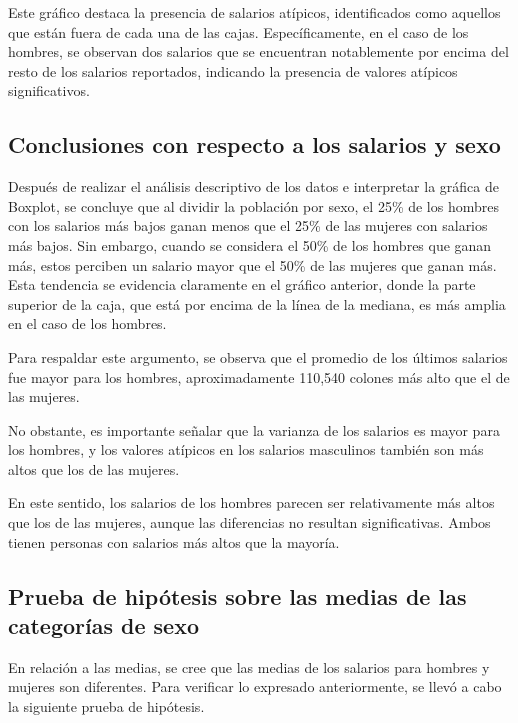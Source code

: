 \documentclass[
]{article}
\begin{document}
Este gráfico destaca la presencia de salarios atípicos, identificados
como aquellos que están fuera de cada una de las cajas. Específicamente,
en el caso de los hombres, se observan dos salarios que se encuentran
notablemente por encima del resto de los salarios reportados, indicando
la presencia de valores atípicos significativos.

\hypertarget{conclusiones-con-respecto-a-los-salarios-y-sexo}{%
\subsection{Conclusiones con respecto a los salarios y
sexo}\label{conclusiones-con-respecto-a-los-salarios-y-sexo}}

Después de realizar el análisis descriptivo de los datos e interpretar
la gráfica de Boxplot, se concluye que al dividir la población por sexo,
el 25\% de los hombres con los salarios más bajos ganan menos que el
25\% de las mujeres con salarios más bajos. Sin embargo, cuando se
considera el 50\% de los hombres que ganan más, estos perciben un
salario mayor que el 50\% de las mujeres que ganan más. Esta tendencia
se evidencia claramente en el gráfico anterior, donde la parte superior
de la caja, que está por encima de la línea de la mediana, es más amplia
en el caso de los hombres.

Para respaldar este argumento, se observa que el promedio de los últimos
salarios fue mayor para los hombres, aproximadamente 110,540 colones más
alto que el de las mujeres.

No obstante, es importante señalar que la varianza de los salarios es
mayor para los hombres, y los valores atípicos en los salarios
masculinos también son más altos que los de las mujeres.

En este sentido, los salarios de los hombres parecen ser relativamente
más altos que los de las mujeres, aunque las diferencias no resultan
significativas. Ambos tienen personas con salarios más altos que la
mayoría.

\hypertarget{prueba-de-hipuxf3tesis-sobre-las-medias-de-las-categoruxedas-de-sexo}{%
\subsection{Prueba de hipótesis sobre las medias de las categorías de
sexo}\label{prueba-de-hipuxf3tesis-sobre-las-medias-de-las-categoruxedas-de-sexo}}

En relación a las medias, se cree que las medias de los salarios para
hombres y mujeres son diferentes. Para verificar lo expresado
anteriormente, se llevó a cabo la siguiente prueba de hipótesis.
\end{document}
